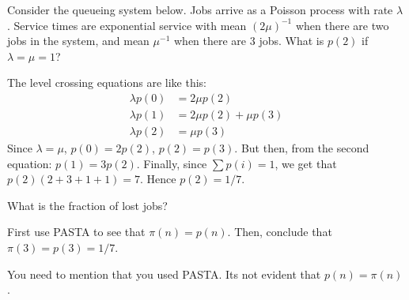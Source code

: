 \begin{exercise}[201807]{1}\label{ex:86}
Consider the queueing system below. Jobs arrive as a Poisson process with rate $\lambda$. Service times are exponential service with  mean $(2\mu)^{-1}$ when there are two jobs in the system, and mean $\mu^{-1}$ when there are 3 jobs. What is $p(2)$ if $\lambda=\mu=1$?

\begin{center}
\end{center}


\begin{solution}
The  level crossing equations are like this:
  \begin{align*}
    \lambda p(0)  &= 2\mu p(2) \\
    \lambda p(1)  &= 2\mu p(2) +\mu p(3) \\
    \lambda p(2)  &= \mu p(3) 
  \end{align*}
Since $\lambda=\mu$,  $p(0) = 2p(2)$, $p(2) = p(3)$. But then, from the second equation: $p(1) = 3p(2)$. Finally, since $\sum p(i) = 1$, we get that $p(2)(2+3+1+1)=7$. Hence $p(2)=1/7$. 
\end{solution}
\end{exercise}


\begin{exercise}[201807]{1} What is the fraction of lost jobs?
\begin{solution}
    First use PASTA to see that $\pi(n) = p(n)$. Then, conclude that $\pi(3) = p(3) = 1/7$. 

You need to mention that you used PASTA. Its not evident that $p(n)=\pi(n)$. 
\end{solution}
\end{exercise}

